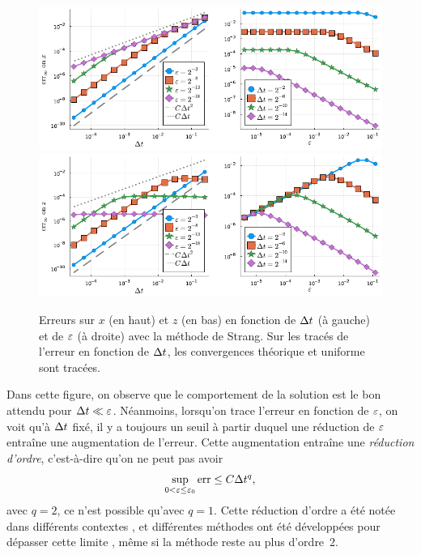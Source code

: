 \begin{figure}
    \centering
    \includegraphics[width=\textwidth]{./Presentation/strang_err_x.pdf}
    \includegraphics[width=\textwidth]{./Presentation/strang_err_z.pdf}
    \caption{Erreurs sur $x$ (en haut) et $z$ (en bas) en fonction de $\Delta t$ (à gauche) et de $\varepsilon$ (à droite) avec la méthode de Strang. Sur les tracés de l'erreur en fonction de $\Delta t$, les convergences théorique et uniforme sont tracées.}
    \label{sec:intro:fig:strang}
\end{figure}

Dans cette figure, on observe que le comportement de la solution est le bon attendu pour $\Delta t \ll \varepsilon$. Néanmoins, lorsqu'on trace l'erreur en fonction de $\varepsilon$, on voit qu'à $\Delta t$ fixé, il y a toujours un seuil à partir duquel une réduction de $\varepsilon$ entraîne une augmentation de l'erreur. Cette augmentation entraîne une \textit{réduction d'ordre}, c'est-à-dire qu'on ne peut pas avoir
\begin{equation*}
    \sup_{0 < \varepsilon \leq \varepsilon_0} \operatorname{err} \leq C \Delta t^q ,
\end{equation*}
avec $q = 2$, ce n'est possible qu'avec $q = 1$. Cette réduction d'ordre a été notée dans différents contextes \cite{sportisse.2000.analysis,faou.2015.analysis}, et différentes méthodes ont été développées pour dépasser cette limite \cite{einkemmer.2015.overcoming,cano.2017.avoiding,bertoli.2020.strang}, même si la méthode reste au plus d'ordre~2.

